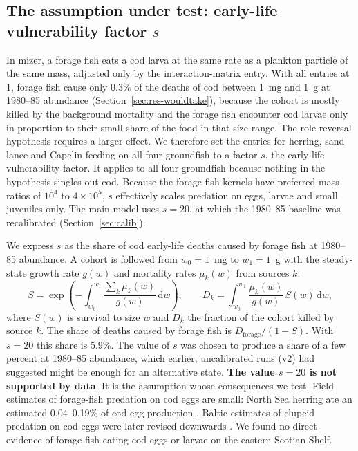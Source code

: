 \documentclass[12pt,letterpaper,fleqn]{article}
\begin{document}
\subsection{The assumption under test: early-life vulnerability factor \texorpdfstring{$s$}{s}}\label{sec:s}

In mizer, a forage fish eats a cod larva at the same rate as a plankton particle of the same mass, adjusted only by the interaction-matrix entry. With all entries at 1, forage fish cause only 0.3\% of the deaths of cod between 1~mg and 1~g at 1980--85 abundance (Section~\ref{sec:res-wouldtake}), because the cohort is mostly killed by the background mortality and the forage fish encounter cod larvae only in proportion to their small share of the food in that size range. The role-reversal hypothesis requires a larger effect. We therefore set the entries for herring, sand lance and Capelin feeding on all four groundfish to a factor $s$, the early-life vulnerability factor. It applies to all four groundfish because nothing in the hypothesis singles out cod. Because the forage-fish kernels have preferred mass ratios of $10^{4}$ to $4\times10^{5}$, $s$ effectively scales predation on eggs, larvae and small juveniles only. The main model uses $s=20$, at which the 1980--85 baseline was recalibrated (Section~\ref{sec:calib}).

We express $s$ as the share of cod early-life deaths caused by forage fish at 1980--85 abundance. A cohort is followed from $w_0=1$~mg to $w_1=1$~g with the steady-state growth rate $g(w)$ and mortality rates $\mu_k(w)$ from sources $k$:
\begin{equation}
S=\exp\!\left(-\int_{w_0}^{w_1}\frac{\sum_k\mu_k(w)}{g(w)}\,\mathrm{d}w\right),\qquad
D_k=\int_{w_0}^{w_1}\frac{\mu_k(w)}{g(w)}\,S(w)\,\mathrm{d}w ,
\label{eq:budget}
\end{equation}
where $S(w)$ is survival to size $w$ and $D_k$ the fraction of the cohort killed by source $k$. The share of deaths caused by forage fish is $D_{\mathrm{forage}}/(1-S)$. With $s=20$ this share is 5.9\%. The value of $s$ was chosen to produce a share of a few percent at 1980--85 abundance, which earlier, uncalibrated runs (v2) had suggested might be enough for an alternative state. \textbf{The value $s=20$ is not supported by data}. It is the assumption whose consequences we test. Field estimates of forage-fish predation on cod eggs are small: North Sea herring ate an estimated 0.04--0.19\% of cod egg production \autocite{daan1985predation}. Baltic estimates of clupeid predation on cod eggs were later revised downwards \autocite{koster2000trophodynamic,neumann2017quantifying}. We found no direct evidence of forage fish eating cod eggs or larvae on the eastern Scotian Shelf.
\end{document}

